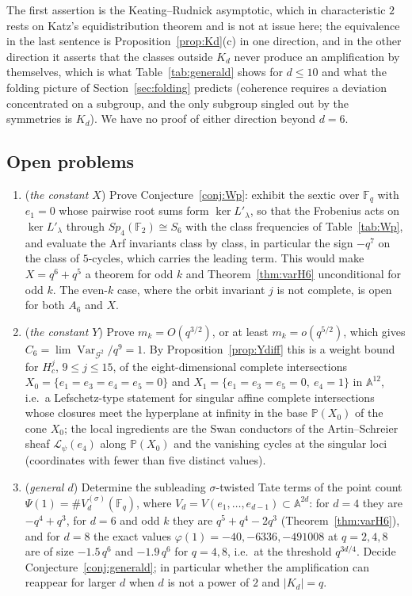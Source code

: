 \documentclass[11pt,a4paper]{amsart}
\theoremstyle{definition}
\newcommand{\F}{\mathbb{F}}
\newcommand{\A}{\mathbb{A}}
\newcommand{\G}{\mathcal{G}}
\newcommand{\Var}{\operatorname{Var}}
\begin{document}
The first assertion is the Keating--Rudnick asymptotic, which in characteristic $2$ rests on Katz's equidistribution theorem \cite{Katz} and is not at issue here; the equivalence in the last sentence is Proposition~\ref{prop:Kd}(c) in one direction, and in the other direction it asserts that the classes outside $K_d$ never produce an amplification by themselves, which is what Table~\ref{tab:generald} shows for $d\le10$ and what the folding picture of Section~\ref{sec:folding} predicts (coherence requires a deviation concentrated on a subgroup, and the only subgroup singled out by the symmetries is $K_d$). We have no proof of either direction beyond $d=6$.

\subsection{Open problems}
\begin{sloppypar}
\begin{enumerate}[label=\textbf{Open Problem 9.\arabic*.},wide,labelindent=0pt,itemsep=0.8ex]
\item (\emph{the constant $X$}) Prove Conjecture~\ref{conj:Wp}: exhibit the sextic over $\F_q$ with $e_1=0$ whose pairwise root sums form $\ker L'_\lambda$, so that the Frobenius acts on $\ker L'_\lambda$ through $Sp_4(\F_2)\cong S_6$ with the class frequencies of Table~\ref{tab:Wp}, and evaluate the Arf invariants class by class, in particular the sign $-q^7$ on the class of $5$-cycles, which carries the leading term. This would make $X=q^6+q^5$ a theorem for odd $k$ and Theorem~\ref{thm:varH6} unconditional for odd $k$. The even-$k$ case, where the orbit invariant $j$ is not complete, is open for both $A_6$ and $X$.
\item (\emph{the constant $Y$}) Prove $m_k=O(q^{3/2})$, or at least $m_k=o(q^{5/2})$, which gives $C_6=\lim\Var_{\G^2}/q^9=1$. By Proposition~\ref{prop:Ydiff} this is a weight bound for $H^j_c$, $9\le j\le15$, of the eight-dimensional complete intersections $X_0=\{e_1=e_3=e_4=e_5=0\}$ and $X_1=\{e_1=e_3=e_5=0,\ e_4=1\}$ in $\A^{12}$, i.e.\ a Lefschetz-type statement for singular affine complete intersections whose closures meet the hyperplane at infinity in the base $\mathbb P(X_0)$ of the cone $X_0$; the local ingredients are the Swan conductors of the Artin--Schreier sheaf $\mathcal L_{\psi}(e_4)$ along $\mathbb P(X_0)$ and the vanishing cycles at the singular loci (coordinates with fewer than five distinct values).
\item (\emph{general $d$}) Determine the subleading $\sigma$-twisted Tate terms of the point count $\Psi(1)=\#V_d^{(\sigma)}(\F_q)$, where $V_d=V(e_1,\dots,e_{d-1})\subset\A^{2d}$: for $d=4$ they are $-q^4+q^3$, for $d=6$ and odd $k$ they are $q^5+q^4-2q^3$ (Theorem~\ref{thm:varH6}), and for $d=8$ the exact values $\varphi(1)=-40,-6336,-491008$ at $q=2,4,8$ are of size $-1.5\,q^6$ and $-1.9\,q^6$ for $q=4,8$, i.e.\ at the threshold $q^{3d/4}$. Decide Conjecture~\ref{conj:generald}; in particular whether the amplification can reappear for larger $d$ when $d$ is not a power of $2$ and $|K_d|=q$.
\end{enumerate}
\end{sloppypar}
\end{document}
